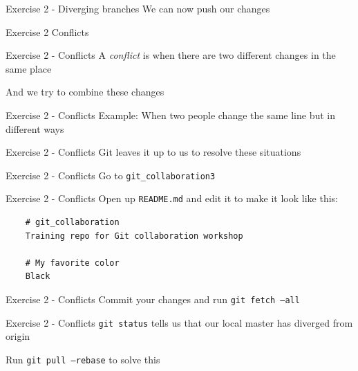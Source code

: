 \documentclass{beamer}
\newcommand{\fmtcmd}[1]{\texttt{#1}}
\begin{document}
\begin{frame}{Exercise 2 - Diverging branches}
  \center
  \Huge We can now push our changes
\end{frame}

\begin{frame}{Exercise 2}
  \center
  \Huge Conflicts
\end{frame}

\begin{frame}{Exercise 2 - Conflicts}
  \center
  \huge A \emph{conflict} is when there are two different changes in
  the same place
  \pause

  \LARGE And we try to combine these changes
\end{frame}

\begin{frame}{Exercise 2 - Conflicts}
  \center
  \Huge Example: When two people change the same line but in different ways
\end{frame}

\begin{frame}{Exercise 2 - Conflicts}
  \center
  \Huge Git leaves it up to us to resolve these situations
\end{frame}

\begin{frame}{Exercise 2 - Conflicts}
  \center
  \huge Go to \fmtcmd{git_collaboration3}
\end{frame}

\begin{frame}[fragile]{Exercise 2 - Conflicts}
  Open up \fmtcmd{README.md} and edit it to make it look like this:

  \begin{verbatim}
    # git_collaboration
    Training repo for Git collaboration workshop

    # My favorite color
    Black
  \end{verbatim}
\end{frame}

\begin{frame}{Exercise 2 - Conflicts}
  \center
  \huge Commit your changes and run \fmtcmd{git fetch --all}
\end{frame}

\begin{frame}{Exercise 2 - Conflicts}
  \center
  \huge \fmtcmd{git status} tells us that our local master has diverged from origin
  \pause

  \LARGE Run \fmtcmd{git pull --rebase} to solve this
\end{frame}
\end{document}

